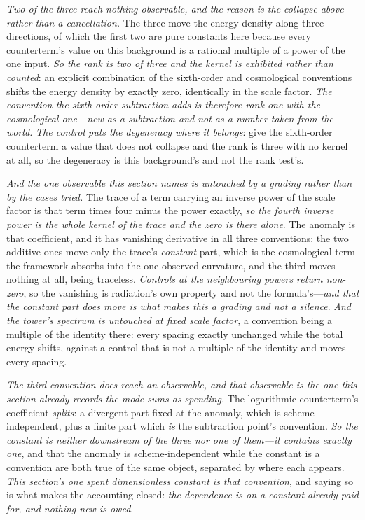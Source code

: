 \documentclass[11pt,a4paper]{article}
\theoremstyle{plain}
\theoremstyle{definition}
\theoremstyle{remark}
\begin{document}
\emph{Two of the three reach nothing observable, and the reason is the collapse above rather than a
cancellation.} The three move the energy density along three directions, of which the first two are pure
constants here because every counterterm's value on this background is a rational multiple of a power of the
one input. \emph{So the rank is two of three and the kernel is exhibited rather than counted}: an explicit
combination of the sixth-order and cosmological conventions shifts the energy density by exactly zero,
identically in the scale factor. \emph{The convention the sixth-order subtraction adds is therefore rank one with the
cosmological one---new as a subtraction and not as a number taken from the world.} \emph{The control puts the
degeneracy where it belongs}: give the sixth-order counterterm a value that does not collapse and the rank is
three with no kernel at all, so the degeneracy is this background's and not the rank test's.

\emph{And the one observable this section names is untouched by a grading rather than by the cases tried.}
The trace of a term carrying an inverse power of the scale factor is that term times four minus the power
exactly, \emph{so the fourth inverse power is the whole kernel of the trace and the zero is there alone}. The
anomaly is that coefficient, and it has vanishing derivative in all three conventions: the two additive ones
move only the trace's \emph{constant} part, which is the cosmological term the framework absorbs into the one
observed curvature, and the third moves nothing at all, being traceless. \emph{Controls at the neighbouring
powers return non-zero}, so the vanishing is radiation's own property and not the formula's---\emph{and that
the constant part does move is what makes this a grading and not a silence}. \emph{And the tower's spectrum is
untouched at fixed scale factor}, a convention being a multiple of the identity there: every spacing exactly
unchanged while the total energy shifts, against a control that is not a multiple of the identity and moves
every spacing.

\emph{The third convention does reach an observable, and that observable is the one this section already
records the mode sums as spending.} The logarithmic counterterm's coefficient \emph{splits}: a divergent part
fixed at the anomaly, which is scheme-independent, plus a finite part which \emph{is} the subtraction point's
convention. \emph{So the constant is neither downstream of the three nor one of them---it contains exactly
one}, and that the anomaly is scheme-independent while the constant is a convention are both true of the same
object, separated by where each appears. \emph{This section's one spent dimensionless constant is that
convention}, and saying so is what makes the accounting closed: \emph{the dependence is on a constant already
paid for, and nothing new is owed}.
\end{document}
